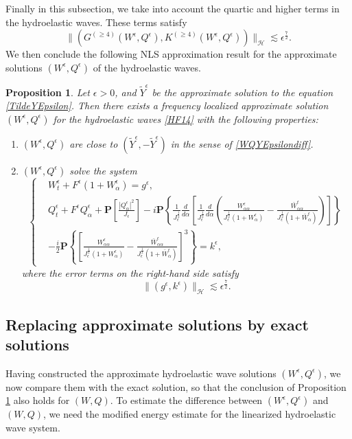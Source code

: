 \documentclass[12pt]{amsart}
\newtheorem{proposition}[theorem]{Proposition}
\theoremstyle{remark}
\theoremstyle{definition}
\numberwithin{equation}{section}
\newcommand{\e}{\epsilon}
\renewcommand{\H}{{\mathcal H }}
\newcommand{\al}{\alpha}
\newcommand{\f}{\frac}
\newcommand{\nP}{{\mathbf P}}
\begin{document}
Finally in this subsection, we take into account the quartic and higher terms in the hydroelastic waves.
These terms satisfy
\begin{equation*}
 \|(G^{(\geq 4)}(W^\e, Q^\e), K^{(\geq 4)}(W^\e, Q^\e))\|_{\H} \lesssim \epsilon^{\f72}.
\end{equation*}
We then conclude the following NLS approximation result for the approximate solutions $(W^\e, Q^\e)$ of the hydroelastic waves.
\begin{proposition} \label{t:ApproximateWQ}
Let $\epsilon>0$, and $\tilde{Y}^\e$ be the approximate solution to the equation \eqref{TildeYEpsilon}.
Then there exists a frequency localized approximate solution $(W^\e, Q^\e)$ for the hydroelastic waves \eqref{HF14} with the following properties:
\begin{enumerate}
\item $(W^\e, Q^\e)$ are close to $(\tilde{Y}^\e, -\tilde{Y}^\e)$ in the sense of \eqref{WQYEpsilondiff}.
\item $(W^\e, Q^\e)$ solve the system
\begin{equation*}
\begin{cases}
&W^\e_t+F^\e(1+W^\e_{\al})= g^\e,\\
&Q^\e_t+F^\e Q^\e_{\al}+\nP\left[\f{|Q^\e_{\al}|^2}{J_\e}\right]
-i \nP\left\{\f{1}{J_\e^{\f12}}\f{d}{d\al}\left[\f{1}{J_\e^{\f12}}\f{d}{d\al}\left(\f{W^\e_{\al\al}}{J_\e^{\f12}(1+W^\e_{\al})}
-\f{\bar{W}^\e_{\al\al}}{J_\e^{\f12}(1+\bar{W}^\e_{\al})}\right)\right]\right\}\\
&-\f{i}{2} \nP\left\{\left[\f{W^\e_{\al\al}}{J_\e^{\f12}(1+W^\e_{\al})}-\f{\bar{W}^\e_{\al\al}}{J_\e^{\f12}(1+\bar{W}^\e_{\al})}\right]^3\right\}= k^\e,
\end{cases}
\end{equation*}
where the error terms on the right-hand side satisfy
\begin{equation*}
 \|(g^\e, k^\e)\|_{\H} \lesssim \e^{\f72}.
\end{equation*}
\end{enumerate}
\end{proposition}

\subsection{Replacing approximate solutions by exact solutions} \label{s:ReplaceExact}
Having constructed the approximate hydroelastic wave solutions $(W^\e, Q^\e)$, we now compare them with the exact solution, so that the conclusion of Proposition \ref{t:ApproximateWQ} also holds for $(W, Q)$.
To estimate the difference between $(W^\e, Q^\e)$ and $(W, Q)$, we need the modified energy estimate for the linearized hydroelastic wave system.
\end{document}

